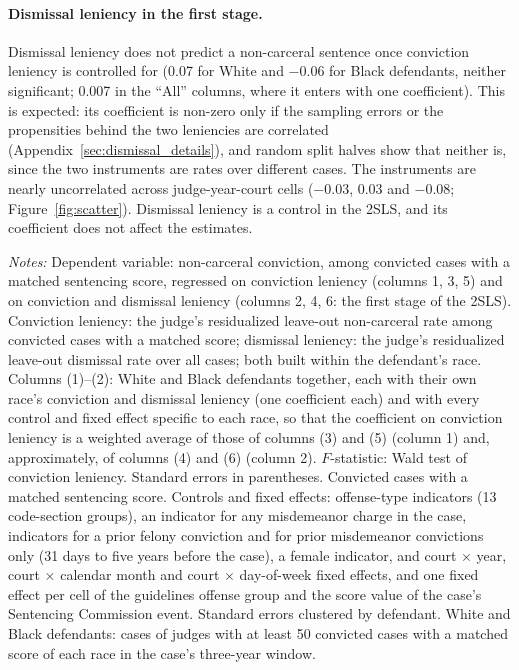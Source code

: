 \documentclass[11pt]{article}
\newcommand{\tabnote}[1]{\par\vspace{0.6ex}\begin{minipage}{\linewidth}\linespread{1}\footnotesize\textit{Notes:} #1\end{minipage}}
\newcommand{\controlsnote}{offense-type indicators (13 code-section groups), an indicator for any misdemeanor charge in the case, indicators for a prior felony conviction and for prior misdemeanor convictions only (31 days to five years before the case), a female indicator, and court $\times$ year, court $\times$ calendar month and court $\times$ day-of-week fixed effects}
\newcommand{\specnoteprim}{Convicted cases with a matched sentencing score. Controls and fixed effects: \controlsnote, and one fixed effect per cell of the guidelines offense group and the score value of the case's Sentencing Commission event. Standard errors clustered by defendant.}
\newcommand{\racesamplenote}{White and Black defendants: cases of judges with at least 50 convicted cases with a matched score of each race in the case's three-year window.}
\begin{document}
\paragraph{Dismissal leniency in the first stage.} Dismissal leniency does not predict a non-carceral sentence once conviction leniency is controlled for (0.07 for White and $-0.06$ for Black defendants, neither significant; 0.007 in the ``All'' columns, where it enters with one coefficient). This is expected: its coefficient is non-zero only if the sampling errors or the propensities behind the two leniencies are correlated (Appendix~\ref{sec:dismissal_details}), and random split halves show that neither is, since the two instruments are rates over different cases. The instruments are nearly uncorrelated across judge-year-court cells ($-0.03$, 0.03 and $-0.08$; Figure~\ref{fig:scatter}). Dismissal leniency is a control in the 2SLS, and its coefficient does not affect the estimates.

\begin{table}[H]
\centering
\caption{First stages: non-carceral conviction}\label{tab:fs_primary}

\tabnote{Dependent variable: non-carceral conviction, among convicted cases with a matched sentencing score, regressed on conviction leniency (columns 1, 3, 5) and on conviction and dismissal leniency (columns 2, 4, 6: the first stage of the 2SLS). Conviction leniency: the judge's residualized leave-out non-carceral rate among convicted cases with a matched score; dismissal leniency: the judge's residualized leave-out dismissal rate over all cases; both built within the defendant's race. Columns (1)--(2): White and Black defendants together, each with their own race's conviction and dismissal leniency (one coefficient each) and with every control and fixed effect specific to each race, so that the coefficient on conviction leniency is a weighted average of those of columns (3) and (5) (column 1) and, approximately, of columns (4) and (6) (column 2). $F$-statistic: Wald test of conviction leniency. Standard errors in parentheses. \specnoteprim{} \racesamplenote}
\end{table}
\end{document}

